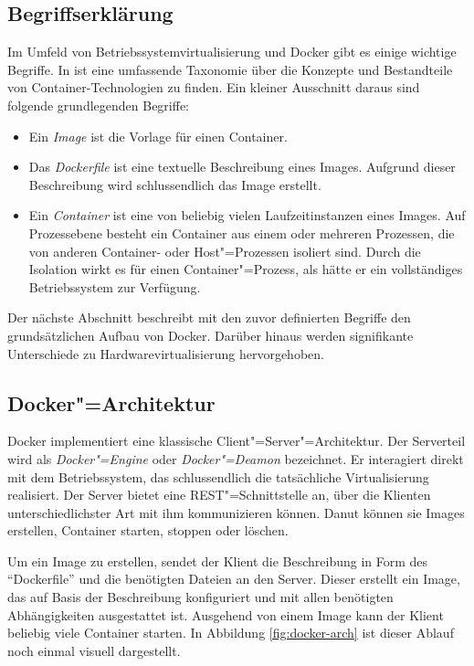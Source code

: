 \subsection{Begriffserklärung}

Im Umfeld von Betriebssystemvirtualisierung und Docker gibt es einige wichtige Begriffe. In \cite{paper_ernst_containers} ist eine umfassende Taxonomie über die Konzepte und Bestandteile von Container-Technologien zu finden. Ein kleiner Ausschnitt daraus sind folgende grundlegenden Begriffe:

\begin{itemize}
	\item Ein \textit{Image} ist die Vorlage für einen Container.
	\item Das \textit{Dockerfile} ist eine textuelle Beschreibung eines Images. Aufgrund dieser Beschreibung wird schlussendlich das Image erstellt.
	\item Ein \textit{Container} ist eine von beliebig vielen Laufzeitinstanzen eines Images. Auf Prozessebene besteht ein Container aus einem oder mehreren Prozessen, die von anderen Container- oder Host"=Prozessen isoliert sind. Durch die Isolation wirkt es für einen Container"=Prozess, als hätte er ein vollständiges Betriebssystem zur Verfügung.
\end{itemize}

Der nächste Abschnitt beschreibt mit den zuvor definierten Begriffe den grundsätzlichen Aufbau von Docker. Darüber hinaus werden signifikante Unterschiede zu Hardwarevirtualisierung hervorgehoben.

\subsection{Docker"=Architektur}

Docker implementiert eine klassische Client"=Server"=Architektur. Der Serverteil wird als \textit{Docker"=Engine} oder \textit{Docker"=Deamon} bezeichnet. Er interagiert direkt mit dem Betriebssystem, das schlussendlich die tatsächliche Virtualisierung realisiert. Der Server bietet eine REST"=Schnittstelle an, über die Klienten unterschiedlichster Art mit ihm kommunizieren können. Danut können sie \zB Images erstellen, Container starten, stoppen oder löschen.

Um ein Image zu erstellen, sendet der Klient die Beschreibung in Form des "`Dockerfile"' und die benötigten Dateien an den Server. Dieser erstellt ein Image, das auf Basis der Beschreibung konfiguriert und mit allen benötigten Abhängigkeiten ausgestattet ist. Ausgehend von einem Image kann der Klient beliebig viele Container starten. In Abbildung \ref{fig:docker-arch} ist dieser Ablauf noch einmal visuell dargestellt.

